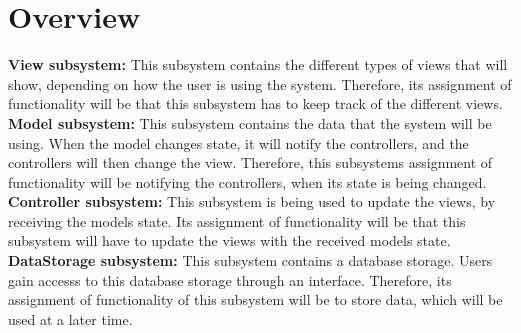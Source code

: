 \section{Overview}
\textbf{View subsystem:}
This subsystem contains the different types of views that will show, depending on how the user is 
using the system. Therefore, its assignment of functionality will be that this subsystem 
has to keep track of the different views.\\
\textbf{Model subsystem:}
This subsystem contains the data that the system will be using. When the model changes state, 
it will notify the controllers, and the controllers will then change the view. Therefore, 
this subsystems assignment of functionality will be notifying the controllers, 
when its state is being changed.\\
\textbf{Controller subsystem:}
This subsystem is being used to update the views, by receiving the models state. 
Its assignment of functionality will be that this subsystem will have to update the views 
with the received models state.\\
\textbf{DataStorage subsystem:}
This subsystem contains a database storage. Users gain accesss to this database storage through an interface.
Therefore, its assignment of functionality of this subsystem will be to store data, which will be used at a later time.